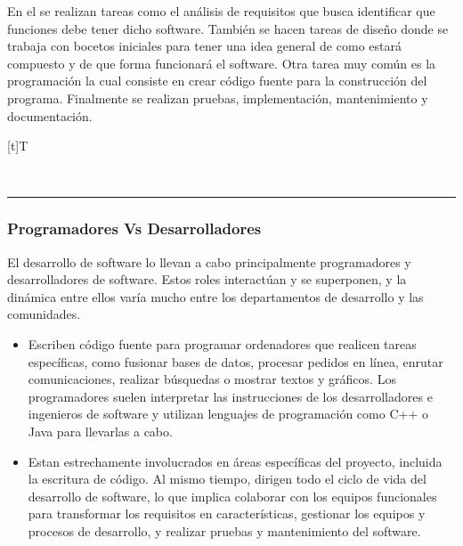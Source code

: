 \documentclass[letterpaper,10pt,spanish]{sphinxmanual}
\let\sphinxpxdimen\pdfpxdimen\else\newdimen\sphinxpxdimen
\begin{document}
\sphinxAtStartPar
En el  se realizan tareas como el análisis de requisitos que busca identificar que funciones debe tener dicho software. También se hacen tareas de diseño donde se trabaja con bocetos iniciales para tener una idea general de como estará compuesto y de que forma funcionará el software. Otra tarea muy común es la programación la cual consiste en crear código fuente para la construcción del programa. Finalmente se realizan pruebas, implementación, mantenimiento y documentación.


\begin{savenotes}\sphinxattablestart
\sphinxthistablewithglobalstyle
\centering
\begin{tabulary}{\linewidth}[t]{T}
\sphinxtoprule
\sphinxtableatstartofbodyhook

\begin{sphinxfigure-in-table}
\centering
\capstart
\noindent\sphinxincludegraphics[width=360\sphinxpxdimen]{{image027}.png}
\label{\detokenize{1_guias/10programacion/G1021:id2}}\end{sphinxfigure-in-table}\relax
\\
\sphinxbottomrule
\end{tabulary}
\sphinxtableafterendhook\par
\sphinxattableend\end{savenotes}


\bigskip\hrule\bigskip



\subsubsection{Programadores Vs Desarrolladores}
\label{\detokenize{1_guias/10programacion/G1021:programadores-vs-desarrolladores}}
\sphinxAtStartPar
El desarrollo de software lo llevan a cabo principalmente programadores y desarrolladores de software. Estos roles interactúan y se superponen, y la dinámica entre ellos varía mucho entre los departamentos de desarrollo y las comunidades.
\begin{itemize}
\item {} 
\sphinxAtStartPar
{} Escriben código fuente para programar ordenadores que realicen tareas específicas, como fusionar bases de datos, procesar pedidos en línea, enrutar comunicaciones, realizar búsquedas o mostrar textos y gráficos. Los programadores suelen interpretar las instrucciones de los desarrolladores e ingenieros de software y utilizan lenguajes de programación como C++ o Java para llevarlas a cabo.

\item {} 
\sphinxAtStartPar
{} Estan estrechamente involucrados en áreas específicas del proyecto, incluida la escritura de código. Al mismo tiempo, dirigen todo el ciclo de vida del desarrollo de software, lo que implica colaborar con los equipos funcionales para transformar los requisitos en características, gestionar los equipos y procesos de desarrollo, y realizar pruebas y mantenimiento del software.

\end{itemize}
\end{document}
